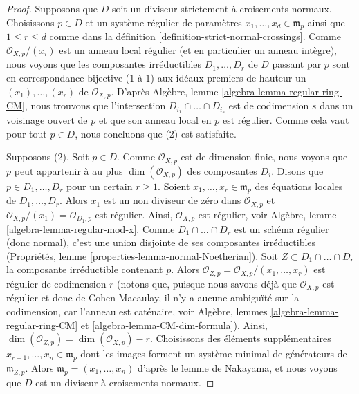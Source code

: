 \begin{proof}
Supposons que $D$ soit un diviseur strictement à croisements normaux. Choisissons $p \in D$
et un système régulier de paramètres $x_1, \ldots, x_d \in \mathfrak m_p$
ainsi que $1 \leq r \leq d$ comme dans la
définition \ref{definition-strict-normal-crossings}.
Comme $\mathcal{O}_{X, p}/(x_i)$ est un anneau local régulier
(et en particulier un anneau intègre), nous voyons que les composantes irréductibles
$D_1, \ldots, D_r$ de $D$ passant par $p$ sont en correspondance bijective ($1$ à $1$)
aux idéaux premiers de hauteur un $(x_1), \ldots, (x_r)$ de $\mathcal{O}_{X, p}$.
D'après Algèbre, lemme \ref{algebra-lemma-regular-ring-CM},
nous trouvons que l'intersection $D_{i_1} \cap \ldots \cap D_{i_s}$
est de codimension $s$ dans un voisinage ouvert de $p$
et que son anneau local en $p$ est régulier.
Comme cela vaut pour tout $p \in D$, nous concluons que (2) est satisfaite.

\medskip\noindent
Supposons (2). Soit $p \in D$. Comme $\mathcal{O}_{X, p}$ est de dimension
finie, nous voyons que $p$ peut appartenir à au plus
$\dim(\mathcal{O}_{X, p})$ des composantes $D_i$.
Disons que $p \in D_1, \ldots, D_r$ pour un certain $r \geq 1$.
Soient $x_1, \ldots, x_r \in \mathfrak m_p$ des équations locales
de $D_1, \ldots, D_r$. Alors $x_1$ est un non diviseur de zéro dans $\mathcal{O}_{X, p}$
et $\mathcal{O}_{X, p}/(x_1) = \mathcal{O}_{D_1, p}$ est régulier.
Ainsi, $\mathcal{O}_{X, p}$ est régulier, voir
Algèbre, lemme \ref{algebra-lemma-regular-mod-x}.
Comme $D_1 \cap \ldots \cap D_r$ est un schéma régulier (donc normal),
c'est une union disjointe de ses composantes irréductibles
(Propriétés, lemme \ref{properties-lemma-normal-Noetherian}).
Soit $Z \subset D_1 \cap \ldots \cap D_r$
la composante irréductible contenant $p$.
Alors $\mathcal{O}_{Z, p} = \mathcal{O}_{X, p}/(x_1, \ldots, x_r)$
est régulier de codimension $r$ (notons que, puisque nous savons déjà
que $\mathcal{O}_{X, p}$ est régulier et donc de Cohen-Macaulay,
il n'y a aucune ambiguïté sur la codimension, car l'anneau est caténaire, voir
Algèbre, lemmes \ref{algebra-lemma-regular-ring-CM} et
\ref{algebra-lemma-CM-dim-formula}).
Ainsi, $\dim(\mathcal{O}_{Z, p}) = \dim(\mathcal{O}_{X, p}) - r$.
Choisissons des éléments supplémentaires $x_{r + 1}, \ldots, x_n \in \mathfrak m_p$
dont les images forment un système minimal de générateurs de $\mathfrak m_{Z, p}$.
Alors $\mathfrak m_p = (x_1, \ldots, x_n)$ d'après le lemme de Nakayama,
et nous voyons que $D$ est un diviseur à croisements normaux.
\end{proof}

